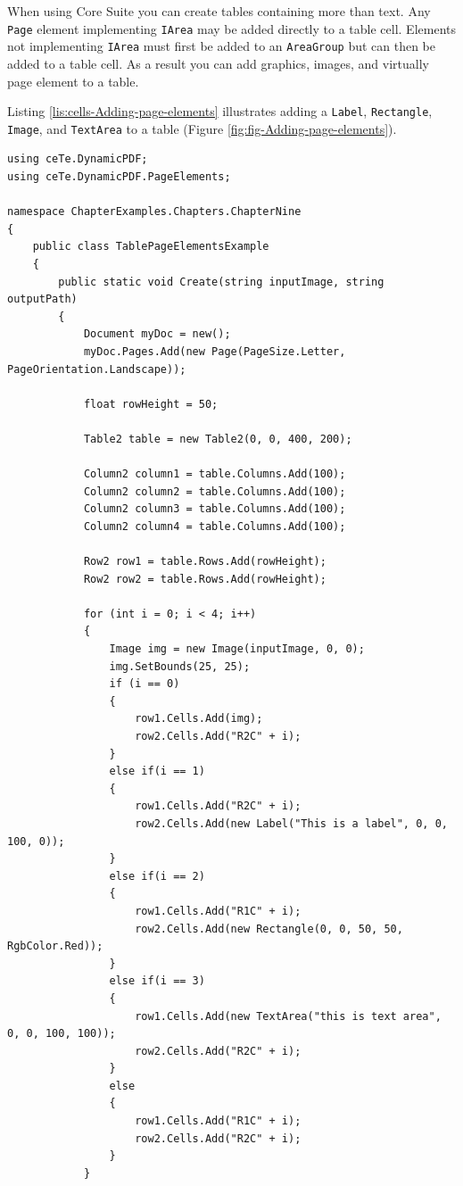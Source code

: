 \documentclass[american,letterpaper]{tufte-book}
\numberwithin{equation}{section}
\numberwithin{figure}{section}
\begin{document}
{When using Core Suite you can create tables containing more than
text. Any \texttt{Page} element implementing \texttt{IArea} may be
added directly to a table cell. Elements not implementing \texttt{IArea}
must first be added to an \texttt{AreaGroup} but can then be added
to a table cell. As a result you can add graphics, images, and virtually
page element to a table. 

Listing \ref{lis:cells-Adding-page-elements} illustrates adding a
\texttt{Label}, \texttt{Rectangle}, \texttt{Image}, and \texttt{TextArea}
to a table (Figure \ref{fig:fig-Adding-page-elements}).

\bgroup{}
\begin{lstlisting}[caption={Adding page elements to table cells.},label={lis:cells-Adding-page-elements},basicstyle={\small\ttfamily},breaklines=true]
using ceTe.DynamicPDF;
using ceTe.DynamicPDF.PageElements;

namespace ChapterExamples.Chapters.ChapterNine
{
    public class TablePageElementsExample
    {
        public static void Create(string inputImage, string outputPath)
        {
            Document myDoc = new();
            myDoc.Pages.Add(new Page(PageSize.Letter, PageOrientation.Landscape));

            float rowHeight = 50;

            Table2 table = new Table2(0, 0, 400, 200);

            Column2 column1 = table.Columns.Add(100);
            Column2 column2 = table.Columns.Add(100);
            Column2 column3 = table.Columns.Add(100);
            Column2 column4 = table.Columns.Add(100);

            Row2 row1 = table.Rows.Add(rowHeight);
            Row2 row2 = table.Rows.Add(rowHeight);

            for (int i = 0; i < 4; i++)
            {
                Image img = new Image(inputImage, 0, 0);
                img.SetBounds(25, 25);
                if (i == 0)
                {
                    row1.Cells.Add(img);
                    row2.Cells.Add("R2C" + i);
                } 
                else if(i == 1)
                {
                    row1.Cells.Add("R2C" + i);
                    row2.Cells.Add(new Label("This is a label", 0, 0, 100, 0));
                }
                else if(i == 2)
                {
                    row1.Cells.Add("R1C" + i);
                    row2.Cells.Add(new Rectangle(0, 0, 50, 50, RgbColor.Red));
                }
                else if(i == 3)
                {
                    row1.Cells.Add(new TextArea("this is text area", 0, 0, 100, 100));
                    row2.Cells.Add("R2C" + i);
                }
                else
                {
                    row1.Cells.Add("R1C" + i);
                    row2.Cells.Add("R2C" + i);
                }
            }


\end{lstlisting}}
\end{document}
